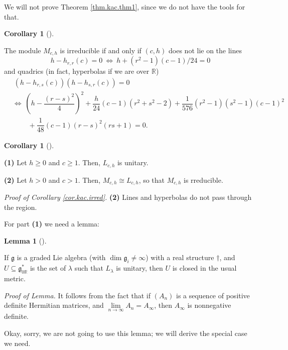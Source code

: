 \documentclass
[numbers=enddot,12pt,final,onecolumn,german,notitlepage]{scrartcl}%
\theoremstyle{definition}
\newtheorem{lem}[theo]{Lemma}
\newenvironment{lemma}[1][]
{\begin{lem}[#1]\begin{leftbar}}
{\end{leftbar}\end{lem}}
\newtheorem{coro}[theo]{Corollary}
\newenvironment{corollary}[1][]
{\begin{coro}[#1]\begin{leftbar}}
{\end{leftbar}\end{coro}}
\begin{document}
We will not prove Theorem \ref{thm.kac.thm1}, since we do not have the tools
for that.

\begin{corollary}
The module $M_{c,h}$ is irreducible if and only if $\left(  c,h\right)  $ does
not lie on the lines
\[
h-h_{r,r}\left(  c\right)  =0\ \Longleftrightarrow\ h+\left(  r^{2}-1\right)
\left(  c-1\right)  /24=0
\]
and quadrics (in fact, hyperbolas if we are over $\mathbb{R}$)%
\begin{align*}
&  \ \left(  h-h_{r,s}\left(  c\right)  \right)  \left(  h-h_{s,r}\left(
c\right)  \right)  =0\\
&  \Longleftrightarrow\ \left(  h-\dfrac{\left(  r-s\right)  ^{2}}{4}\right)
^{2}+\dfrac{h}{24}\left(  c-1\right)  \left(  r^{2}+s^{2}-2\right)  +\dfrac
{1}{576}\left(  r^{2}-1\right)  \left(  s^{2}-1\right)  \left(  c-1\right)
^{2}\\
&  \ \ \ \ \ \ \ \ \ \ +\dfrac{1}{48}\left(  c-1\right)  \left(  r-s\right)
^{2}\left(  rs+1\right)  =0.
\end{align*}

\end{corollary}

\begin{corollary}
\label{cor.kac.irred}\textbf{(1)} Let $h\geq0$ and $c\geq1$. Then, $L_{c,h}$
is unitary.

\textbf{(2)} Let $h>0$ and $c>1$. Then, $M_{c,h}\cong L_{c,h}$, so that
$M_{c,h}$ is rreducible.
\end{corollary}

\textit{Proof of Corollary \ref{cor.kac.irred}.} \textbf{(2)} Lines and
hyperbolas do not pass through the region.

For part \textbf{(1)} we need a lemma:

\begin{lemma}
If $\mathfrak{g}$ is a graded Lie algebra (with $\dim\mathfrak{g}_{i}%
\neq\infty$) with a real structure $\dag$, and $U\subseteq\mathfrak{g}%
_{0\mathbb{R}}^{\ast}$ is the set of $\lambda$ such that $L_{\lambda}$ is
unitary, then $U$ is closed in the usual metric.
\end{lemma}

\textit{Proof of Lemma.} It follows from the fact that if $\left(
A_{n}\right)  $ is a sequence of positive definite Hermitian matrices, and
$\lim\limits_{n\rightarrow\infty}A_{n}=A_{\infty}$, then $A_{\infty}$ is
nonnegative definite.

Okay, sorry, we are not going to use this lemma; we will derive the special
case we need.
\end{document}
